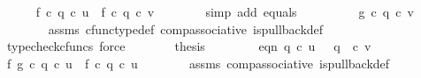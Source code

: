 \begin{isabellebody}
\ \ \ \ \isamarkupfalse%
\ {\isachardoublequoteopen}f\ {\isasymcirc}\isactrlsub c\ {\isacharparenleft}{\kern0pt}q{}\ {\isasymcirc}\isactrlsub c\ u{\isacharparenright}{\kern0pt}\ {\isacharequal}{\kern0pt}\ f\ {\isasymcirc}\isactrlsub c\ q{}\ {\isasymcirc}\isactrlsub c\ v{\isachardoublequoteclose}\isanewline
\ \ \ \ \ \ \isamarkupfalse%
\ {\isacharparenleft}{\kern0pt}simp\ add{\isacharcolon}{\kern0pt}\ equals{\isacharparenright}{\kern0pt}\isanewline
\ \ \ \ \isamarkupfalse%
\ \isamarkupfalse%
\ {\isachardoublequoteopen}{\isachardot}{\kern0pt}{\isachardot}{\kern0pt}{\isachardot}{\kern0pt}\ {\isacharequal}{\kern0pt}\ g\ {\isasymcirc}\isactrlsub c\ {\isacharparenleft}{\kern0pt}q{}\ {\isasymcirc}\isactrlsub c\ v{\isacharparenright}{\kern0pt}{\isachardoublequoteclose}\isanewline
\ \ \ \ \ \ \isamarkupfalse%
\ assms{\isacharparenleft}{\kern0pt}{}{\isacharparenright}{\kern0pt}\ cfunc{\isacharunderscore}{\kern0pt}type{\isacharunderscore}{\kern0pt}def\ comp{\isacharunderscore}{\kern0pt}associative\ is{\isacharunderscore}{\kern0pt}pullback{\isacharunderscore}{\kern0pt}def\ \ \isamarkupfalse%
\ {\isacharparenleft}{\kern0pt}typecheck{\isacharunderscore}{\kern0pt}cfuncs{\isacharcomma}{\kern0pt}\ force{\isacharparenright}{\kern0pt}\isanewline
\ \ \ \ \isamarkupfalse%
\ \isamarkupfalse%
\ {\isacharquery}{\kern0pt}thesis\isacommand{{\isachardot}{\kern0pt}}\isamarkupfalse%
\isanewline
\ \ \isamarkupfalse%
\ \isanewline
\isanewline
\ \ \isamarkupfalse%
\ eqn{}{\isacharcolon}{\kern0pt}\ {\isachardoublequoteopen}q{}\ {\isasymcirc}\isactrlsub c\ u\ {\isacharequal}{\kern0pt}\ \ q{}\ \ {\isasymcirc}\isactrlsub c\ v{\isachardoublequoteclose}\isanewline
\ \ \isamarkupfalse%
\ {\isacharminus}{\kern0pt}\ \isanewline
\ \ \ \ \isamarkupfalse%
\ f{}{\isacharcolon}{\kern0pt}\ {\isachardoublequoteopen}g\ {\isasymcirc}\isactrlsub c\ q{}\ {\isasymcirc}\isactrlsub c\ u\ {\isacharequal}{\kern0pt}\ f\ {\isasymcirc}\isactrlsub c\ q{}\ {\isasymcirc}\isactrlsub c\ u{\isachardoublequoteclose}\isanewline
\ \ \ \ \ \ \isamarkupfalse%
\ assms{\isacharparenleft}{\kern0pt}{}{\isacharparenright}{\kern0pt}\ comp{\isacharunderscore}{\kern0pt}associative{}\ is{\isacharunderscore}{\kern0pt}pullback{\isacharunderscore}{\kern0pt}def\ \ \isamarkupfalse%

\end{isabellebody}
